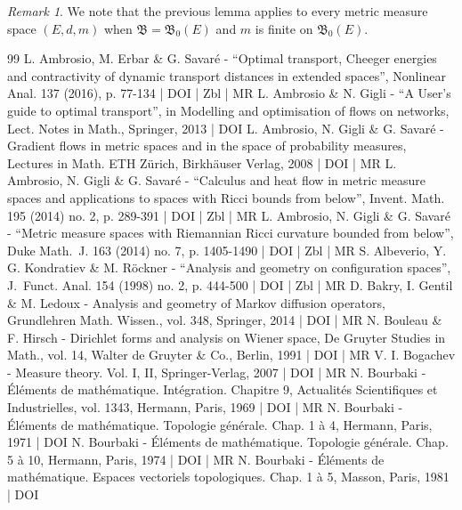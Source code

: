 \documentclass[10pt]{amsart}
\theoremstyle{definition}
\theoremstyle{remark}
\newtheorem{remark}[theorem]{Remark}
\begin{document}
\begin{remark}
We note that the previous lemma applies to every metric measure space $(E,d,m)$ when $\mathfrak{B}=\mathfrak{B}_0(E)$ and $m$ is finite on $\mathfrak{B}_0(E)$.
\end{remark}



\begin{thebibliography}{99}
L. Ambrosio, M. Erbar \& G. Savaré - “Optimal transport, Cheeger energies and contractivity of dynamic transport distances in extended spaces”, Nonlinear Anal. 137 (2016), p. 77-134 | DOI | Zbl | MR
L. Ambrosio \& N. Gigli - “A User’s guide to optimal transport”, in Modelling and optimisation of flows on networks, Lect. Notes in Math., Springer, 2013 | DOI
L. Ambrosio, N. Gigli \& G. Savaré - Gradient flows in metric spaces and in the space of probability measures, Lectures in Math. ETH Zürich, Birkhäuser Verlag, 2008 | DOI | MR
L. Ambrosio, N. Gigli \& G. Savaré - “Calculus and heat flow in metric measure spaces and applications to spaces with Ricci bounds from below”, Invent. Math. 195 (2014) no. 2, p. 289-391 | DOI | Zbl | MR
L. Ambrosio, N. Gigli \& G. Savaré - “Metric measure spaces with Riemannian Ricci curvature bounded from below”, Duke Math. J. 163 (2014) no. 7, p. 1405-1490 | DOI | Zbl | MR
S. Albeverio, Y. G. Kondratiev \& M. Röckner - “Analysis and geometry on configuration spaces”, J. Funct. Anal. 154 (1998) no. 2, p. 444-500 | DOI | Zbl | MR
D. Bakry, I. Gentil \& M. Ledoux - Analysis and geometry of Markov diffusion operators, Grundlehren Math. Wissen., vol. 348, Springer, 2014 | DOI | MR
N. Bouleau \& F. Hirsch - Dirichlet forms and analysis on Wiener space, De Gruyter Studies in Math., vol. 14, Walter de Gruyter \& Co., Berlin, 1991 | DOI | MR
V. I. Bogachev - Measure theory. Vol. I, II, Springer-Verlag, 2007 | DOI | MR
N. Bourbaki - Éléments de mathématique. Intégration. Chapitre 9, Actualités Scientifiques et Industrielles, vol. 1343, Hermann, Paris, 1969 | DOI | MR
N. Bourbaki - Éléments de mathématique. Topologie générale. Chap. 1 à 4, Hermann, Paris, 1971 | DOI
N. Bourbaki - Éléments de mathématique. Topologie générale. Chap. 5 à 10, Hermann, Paris, 1974 | DOI | MR
N. Bourbaki - Éléments de mathématique. Espaces vectoriels topologiques. Chap. 1 à 5, Masson, Paris, 1981 | DOI

\end{thebibliography}
\end{document}
